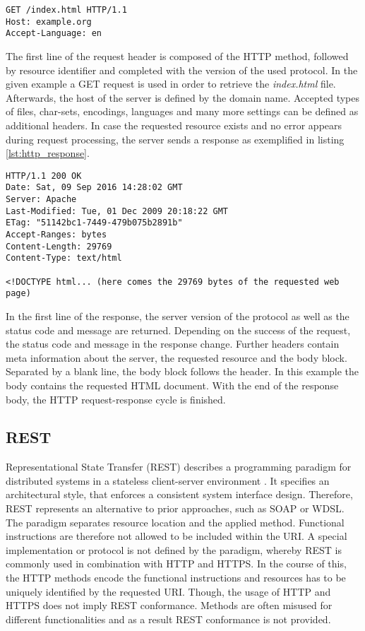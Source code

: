 \begin{lstlisting}[caption={HTTP GET request}, label={lst:http_request}]
GET /index.html HTTP/1.1
Host: example.org
Accept-Language: en
\end{lstlisting}

The first line of the request header is composed of the HTTP method, followed by resource identifier and completed with the version of the used protocol. In the given example a  GET request is used in order to retrieve the \textit{index.html} file. Afterwards, the host of the server is defined by the domain name. Accepted types of files, char-sets, encodings, languages and many more settings can be defined as additional headers. In case the requested resource exists and no error appears during request processing, the server sends a response as exemplified in listing \ref{lst:http_response}.

\begin{lstlisting}[caption={HTTP GET response}, label={lst:http_response}]
HTTP/1.1 200 OK
Date: Sat, 09 Sep 2016 14:28:02 GMT
Server: Apache
Last-Modified: Tue, 01 Dec 2009 20:18:22 GMT
ETag: "51142bc1-7449-479b075b2891b"
Accept-Ranges: bytes
Content-Length: 29769
Content-Type: text/html

<!DOCTYPE html... (here comes the 29769 bytes of the requested web page)
\end{lstlisting}

In the first line of the response, the server version of the protocol as well as the status code and message are returned. Depending on the success of the request, the status code and message in the response change. Further headers contain meta information about the server, the requested resource and the body block. Separated by a blank line, the body block follows the header. In this example the body contains the requested HTML document. With the end of the response body, the HTTP request-response cycle is finished.

\subsection{REST}
Representational State Transfer (REST) describes a programming paradigm for distributed systems in a stateless client-server environment \cite{Fielding:2000}. It specifies an architectural style, that enforces a consistent system interface design. Therefore, REST represents an alternative to prior approaches, such as SOAP or WDSL. The paradigm separates resource location and the applied method. Functional instructions are therefore not allowed to be included within the URI. A special implementation or protocol is not defined by the paradigm, whereby REST is commonly used in combination with HTTP and HTTPS. In the course of this, the HTTP methods encode the functional instructions and resources has to be uniquely identified by the requested URI. Though, the usage of HTTP and HTTPS does not imply REST conformance. Methods are often misused for different functionalities and as a result REST conformance is not provided.

